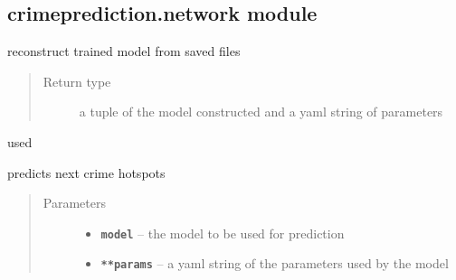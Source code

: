 \documentclass[letterpaper,10pt,english]{sphinxmanual}
\begin{document}
\subsection{crimeprediction.network module}
\label{api/crimeprediction:module-crimeprediction.network}\label{api/crimeprediction:crimeprediction-network-module}

\begin{fulllineitems}
\label{api/crimeprediction:crimeprediction.network.get_trained_model}
reconstruct trained model from saved files
\begin{quote}\begin{description}
\item[{Return type}] \leavevmode
a tuple of the model constructed and a yaml string of parameters

\end{description}\end{quote}

used

\end{fulllineitems}


\begin{fulllineitems}
\label{api/crimeprediction:crimeprediction.network.predict_next}
predicts next crime hotspots
\begin{quote}\begin{description}
\item[{Parameters}] \leavevmode\begin{itemize}
\item {} 
\textbf{\texttt{model}} -- the model to be used for prediction

\item {} 
\textbf{\texttt{**params}} -- 
a yaml string of the parameters used by the model


\end{itemize}

\end{description}\end{quote}

\end{fulllineitems}
\end{document}
